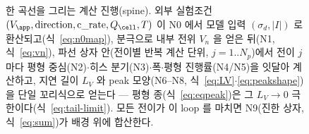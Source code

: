 \begin{figure}[t]
\caption{한 곡선을 그리는 계산 진행(spine). 외부 실험조건 $(V_\app,\text{direction},\text{c\_rate},Q_\cell,T)$
이 N0 에서 모델 입력 $(\sigma_d,|I|)$ 로 환산되고(식~\eqref{eq:n0map}), 분극으로 내부 전위 $V_n$ 을 얻은 뒤(N1,
식~\eqref{eq:vn}), 파선 상자 안(전이별 반복 계산 단위, $j=1..N_p$)에서 전이 $j$ 마다 평형 중심(N2)$\cdot$히스
분기(N3)$\cdot$폭$\cdot$평형 진행률(N4/N5)을 잇달아 계산하고, 지연 길이 $L_V$ 와 peak 모양(N6--N8,
식~\eqref{eq:LV}$\cdot$\eqref{eq:peakshape})을 단일 꼬리식으로 얻는다 --- 평형 종(식~\eqref{eq:eqpeak})은 그 $L_V\!\to\!0$ 극한이다(식~\eqref{eq:tail-limit}).
모든 전이가 이 loop 를 마치면 N9(진한 상자, 식~\eqref{eq:sum})가 배경 위에 합산한다.}
\label{fig:spine}
\end{figure}

\tableofcontents
\newpage


